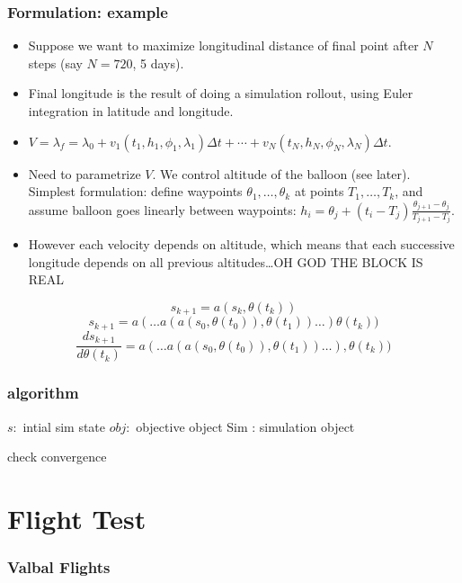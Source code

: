 \documentclass[10pt,mathserif]{beamer}
\begin{document}
\begin{frame}
\frametitle{Formulation: example}
\begin{itemize}
\item Suppose we want to maximize longitudinal distance of final point after $N$ steps (say $N=720$, 5 days).
\item Final longitude is the result of doing a simulation rollout, using Euler integration in latitude and longitude.
\item $V = \lambda_f=\lambda_0 + v_1(t_1, h_1,\phi_1,\lambda_1)\Delta t + \cdots + v_N(t_N, h_N, \phi_N,\lambda_N)\Delta t$.


\item Need to parametrize $V$. We control altitude of the balloon (see later). Simplest formulation: define waypoints $\theta_1,\dots,\theta_k$ at points $T_1,\dots,T_k$, and assume balloon goes linearly between waypoints: $h_i=\theta_j + (t_i-T_j)\frac{\theta_{j+1}-\theta_j}{T_{j+1}-T_j}$.
\item However each velocity depends on altitude, which means that each successive longitude depends on all previous altitudes\dots OH GOD THE BLOCK IS REAL
\end{itemize}
\end{frame}

\begin{frame}
\[s_{k+1} = a(s_k,\theta(t_k))\]
\[s_{k+1} = a(\dots a(a(s_0,\theta(t_0)),\theta(t_1))\dots )\theta(t_k))\]
\[\frac{d s_{k+1}}{d\theta(t_k)} = a(\dots a(a(s_0,\theta(t_0)),\theta(t_1))\dots ),\theta(t_k))\]
\end{frame}

\begin{frame}
\frametitle{algorithm}
\begin{algorithmic}[1]
\State$s:$ intial sim state
\State$obj:$ objective object
\State Sim : simulation object
\EndFor 

check convergence
\EndWhile
\EndProcedure
\end{algorithmic}
\end{frame}

\section{Flight Test}

\begin{frame}
\frametitle{Valbal Flights}
\end{frame}
\end{document}
